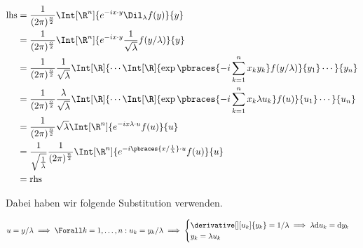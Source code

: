 \begin{solution}
\begin{enumerate}[label = \arabic*.]
    \begin{align*}
        \mathrm{lhs}
        & =
        \frac{1}{(2 \pi)^\frac{n}{2}}
        \Int[\R^n]
        {
            e^{-i x \cdot y}
            \Dil_\lambda f(y)
        }{y} \\
        & =
        \frac{1}{(2 \pi)^\frac{n}{2}}
        \Int[\R^n]
        {
            e^{-i x \cdot y}
            \frac{1}{\sqrt \lambda}
            f(y / \lambda)
        }{y} \\
        & =
        \frac{1}{(2 \pi)^\frac{n}{2}}
        \frac{1}{\sqrt \lambda}
        \Int[\R]
        {
            \cdots
            \Int[\R]
            {
                \exp
                \pbraces
                {
                    -i
                    \sum_{k=1}^n
                    x_k y_k
                }
                f(y / \lambda)
            }{y_1}
            \cdots
        }{y_n} \\
        & =
        \frac{1}{(2 \pi)^\frac{n}{2}}
        \frac{\lambda}{\sqrt \lambda}
        \Int[\R]
        {
            \cdots
            \Int[\R]
            {
                \exp
                \pbraces
                {
                    -i
                    \sum_{k=1}^n
                    x_k \lambda u_k
                }
                f(u)
            }{u_1}
            \cdots
        }{u_n} \\
        & =
        \frac{1}{(2 \pi)^\frac{n}{2}}
        \sqrt \lambda
        \Int[\R^n]
        {
            e^{-i x \lambda \cdot u}
            f(u)
        }{u} \\
        & =
        \frac{1}{\sqrt \frac{1}{\lambda}}
        \frac{1}{(2 \pi)^\frac{n}{2}}
        \Int[\R^n]
        {
            e^{-i \pbraces{x / \frac{1}{\lambda}} \cdot u }
            f(u)
        }{u} \\
        & =
        \mathrm{rhs}
    \end{align*}

    Dabei haben wir folgende Substitution verwenden.

    \begin{align*}
        u = y / \lambda
        \implies
        \Forall k = 1, \dots, n:
        u_k = y_k / \lambda
        \implies
        \begin{cases}
            \derivative[][u_k]{y_k} = 1 / \lambda \implies \lambda \mathrm{d} u_k = \mathrm{d} y_k \\
            y_k = \lambda u_k
        \end{cases}
    \end{align*}

\end{enumerate}

\end{solution}

